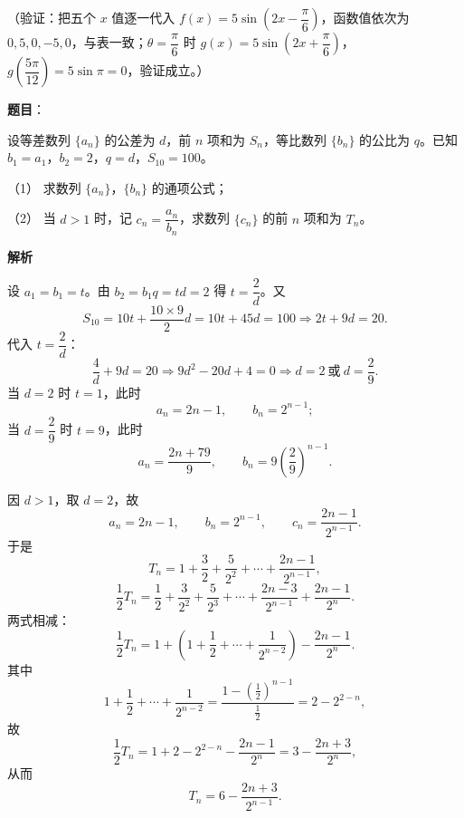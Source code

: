 \begin{answer}
（验证：把五个 \(x\) 值逐一代入 \(f(x)=5\sin\left(2x-\dfrac{\pi}{6}\right)\)，函数值依次为 \(0,5,0,-5,0\)，与表一致；\(\theta=\dfrac{\pi}{6}\) 时 \(g(x)=5\sin\left(2x+\dfrac{\pi}{6}\right)\)，\(g\left(\dfrac{5\pi}{12}\right)=5\sin\pi=0\)，验证成立。）



\end{answer}
\begin{answer}

\textbf{题目}：

设等差数列 \(\{a_n\}\) 的公差为 \(d\)，前 \(n\) 项和为 \(S_n\)，等比数列 \(\{b_n\}\) 的公比为 \(q\)。已知 \(b_1=a_1\)，\(b_2=2\)，\(q=d\)，\(S_{10}=100\)。

（1） 求数列 \(\{a_n\}\)，\(\{b_n\}\) 的通项公式；

（2） 当 \(d>1\) 时，记 \(c_n=\dfrac{a_n}{b_n}\)，求数列 \(\{c_n\}\) 的前 \(n\) 项和为 \(T_n\)。

\textbf{解析}


设 \(a_1=b_1=t\)。由 \(b_2=b_1q=td=2\) 得 \(t=\dfrac2d\)。又
\nopagebreak[4]
\[
S_{10}=10t+\dfrac{10\times9}{2}d=10t+45d=100
\Longrightarrow
2t+9d=20.
\]
代入 \(t=\dfrac2d\)：
\nopagebreak[4]
\[
\dfrac{4}{d}+9d=20
\Longrightarrow
9d^2-20d+4=0
\Longrightarrow
d=2\ \text{或}\ d=\dfrac29.
\]
当 \(d=2\) 时 \(t=1\)，此时
\nopagebreak[4]
\[
a_n=2n-1,\qquad b_n=2^{n-1};
\]
当 \(d=\dfrac29\) 时 \(t=9\)，此时
\nopagebreak[4]
\[
a_n=\dfrac{2n+79}{9},\qquad b_n=9\left(\dfrac29\right)^{n-1}.
\]


因 \(d>1\)，取 \(d=2\)，故
\nopagebreak[4]
\[
a_n=2n-1,\qquad b_n=2^{n-1},\qquad c_n=\dfrac{2n-1}{2^{n-1}}.
\]
于是
\nopagebreak[4]
\[
T_n=1+\dfrac{3}{2}+\dfrac{5}{2^2}+\cdots+\dfrac{2n-1}{2^{n-1}},
\]
\nopagebreak[4]
\[
\dfrac12T_n=\dfrac12+\dfrac{3}{2^2}+\dfrac{5}{2^3}+\cdots+\dfrac{2n-3}{2^{n-1}}+\dfrac{2n-1}{2^n}.
\]
两式相减：
\nopagebreak[4]
\[
\dfrac12T_n
=1+\left(1+\dfrac12+\cdots+\dfrac{1}{2^{n-2}}\right)-\dfrac{2n-1}{2^n}.
\]
其中
\nopagebreak[4]
\[
1+\dfrac12+\cdots+\dfrac{1}{2^{n-2}}
=\dfrac{1-\left(\frac12\right)^{n-1}}{\frac12}
=2-2^{2-n},
\]
故
\nopagebreak[4]
\[
\dfrac12T_n=1+2-2^{2-n}-\dfrac{2n-1}{2^n}
=3-\dfrac{2n+3}{2^n},
\]
从而
\nopagebreak[4]
\[
T_n=6-\dfrac{2n+3}{2^{n-1}}.
\]


\end{answer}
